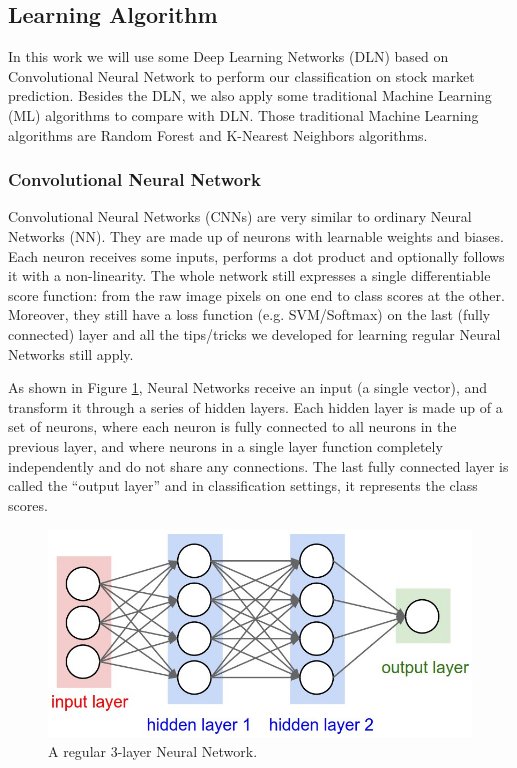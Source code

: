 \documentclass[10pt,twocolumn]{article}
\begin{document}
\subsection{Learning Algorithm}
In this work we will use some Deep Learning Networks (DLN) based on Convolutional Neural Network to perform our classification on stock market prediction. Besides the DLN, we also apply some traditional Machine Learning (ML) algorithms to compare with DLN. Those traditional Machine Learning algorithms are Random Forest and K-Nearest Neighbors algorithms.
\subsubsection{Convolutional Neural Network}
Convolutional Neural Networks (CNNs) are very similar to ordinary Neural Networks (NN). They are made up of neurons with learnable weights and biases. Each neuron receives some inputs, performs a dot product and optionally follows it with a non-linearity. The whole network still expresses a single differentiable score function: from the raw image pixels on one end to class scores at the other. Moreover, they still have a loss function (e.g. SVM/Softmax) on the last (fully connected) layer and all the tips/tricks we developed for learning regular Neural Networks still apply.
\par
As shown in Figure \ref{fig:simpleneuralnetwork}, Neural Networks receive an input (a single vector), and transform it through a series of hidden layers. Each hidden layer is made up of a set of neurons, where each neuron is fully connected to all neurons in the previous layer, and where neurons in a single layer function completely independently and do not share any connections. The last fully connected layer is called the “output layer” and in classification settings, it represents the class scores.
\begin{figure}
  \includegraphics[width=\linewidth]{figures/simpleneuralnetwork.png}
  \caption{A regular 3-layer Neural Network.}
  \label{fig:simpleneuralnetwork}
\end{figure}
\end{document}
